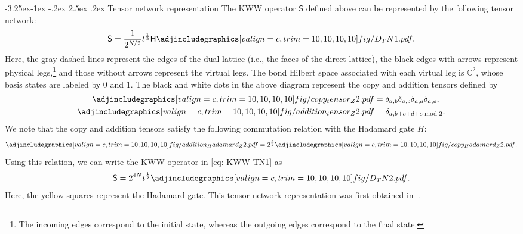 \documentclass[aps,twocolumn,prx,floatfix,preprintnumbers, nofootinbib,10pt]{revtex4-2}
\makeatletter
\numberwithin{equation}{section}
\theoremstyle{definition}
\theoremstyle{remark}
\theoremstyle{claim}
\renewcommand\subsubsection{\@startsection{subsubsection}{3}{\z@}%
                                     {-3.25ex\@plus -1ex \@minus -.2ex}%
                                     {2.5ex \@plus .2ex}%
                                     {\centering\itshape\bfseries\small}}
\makeatother
\begin{document}
\subsubsection{Tensor network representation}
The KWW operator $\mathsf{S}$ defined above can be represented by the following tensor network:
\begin{equation}
\mathsf{S} = \frac{1}{2^{N/2}}t^{\frac{1}{2}} \mathsf{H} \adjincludegraphics[valign=c, trim={10, 10, 10, 10}]{fig/D_TN1.pdf}.
\label{eq: KWW TN1}
\end{equation}
Here, the gray dashed lines represent the edges of the dual lattice (i.e., the faces of the direct lattice), the black edges with arrows represent physical legs,\footnote{The incoming edges correspond to the initial state, whereas the outgoing edges correspond to the final state.} and those without arrows represent the virtual legs.
The bond Hilbert space associated with each virtual leg is $\mathbb{C}^2$, whose basis states are labeled by $0$ and $1$.
The black and white dots in the above diagram represent the copy and addition tensors defined by
\begin{align}
\adjincludegraphics[valign=c, trim={10, 10, 10, 10}]{fig/copy_tensor_Z2.pdf} &= \delta_{a, b} \delta_{a, c} \delta_{a, d} \delta_{a, e}, \\
\adjincludegraphics[valign=c, trim={10, 10, 10, 10}]{fig/addition_tensor_Z2.pdf} &= \delta_{a, b+c+d+e \bmod 2}.
\end{align}
We note that the copy and addition tensors satisfy the following commutation relation with the Hadamard gate $H$:
\begin{equation}
\adjincludegraphics[valign=c, trim={10, 10, 10, 10}]{fig/addition_Hadamard_Z2.pdf} = 2^{\frac{3}{2}} \adjincludegraphics[valign=c, trim={10, 10, 10, 10}]{fig/copy_Hadamard_Z2.pdf}.
\end{equation}
Using this relation, we can write the KWW operator in \eqref{eq: KWW TN1} as
\begin{equation}
\mathsf{S} = 2^{4N} t^{\frac{1}{2}} \adjincludegraphics[valign=c, trim={10, 10, 10, 10}]{fig/D_TN2.pdf}.
\label{eq: KWW TN2}
\end{equation}
Here, the yellow squares represent the Hadamard gate.
This tensor network representation was first obtained in~\cite{Gorantla:2024ocs}.

\end{document}
